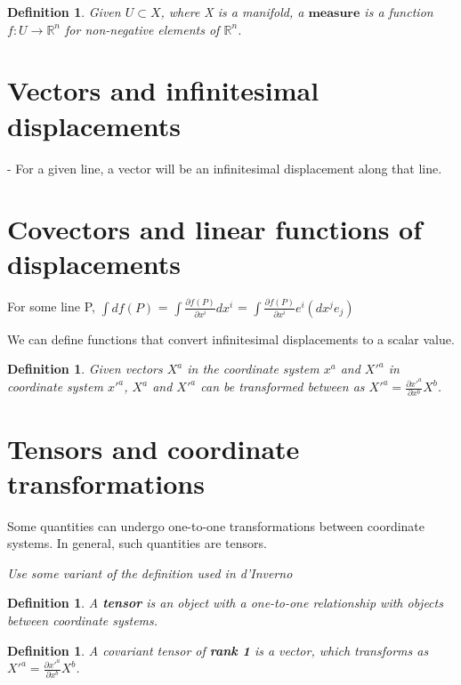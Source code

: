 \documentclass{book}
\newtheorem{defn}[equation]{Definition}
\begin{document}
\begin{defn}
	Given $U \subset X$, where X is a manifold, a $\textbf{measure}$ is a function $f : U \to \mathbb{R}^n$ for non-negative elements of $\mathbb{R}^n$. 
\end{defn}




\section{Vectors and infinitesimal displacements}

- For a given line, a vector will be an infinitesimal displacement along that line. 




\section{Covectors and linear functions of displacements}

For some line P, $\int df(P)$ = $\int \frac{\partial f(P)}{{\partial x^i}} dx^i$ = $\int \frac{{\partial f(P)}}{{\partial x^i}} e^i (dx^j e_j)$

We can define functions that convert infinitesimal displacements to a scalar value. 

\begin{defn}
	Given vectors $X^a$ in the coordinate system $x^a$ and $X'^a$ in coordinate system $x'^a$, $X^a$ and $X'^a$ can be transformed between as $X'^a = \frac{\partial x'^a}{\partial x^b} X^b$. 
\end{defn}

\section{Tensors and coordinate transformations}
Some quantities can undergo one-to-one transformations between coordinate systems. In general, such quantities are tensors. 

\emph{Use some variant of the definition used in d'Inverno}
\begin{defn}
	A \textbf{tensor} is an object with a one-to-one relationship with objects between coordinate systems. 
\end{defn}

\begin{defn}
	A covariant tensor of \textbf{rank 1} is a vector, which transforms as  $X'^a = \frac{\partial x'^a}{\partial x^b} X^b$.  
\end{defn}
\end{document}
